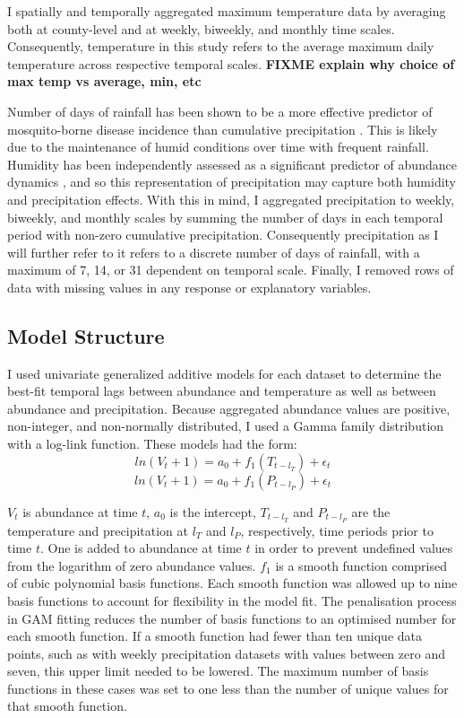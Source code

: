 I spatially and temporally aggregated maximum temperature data by averaging both at county-level and at weekly, biweekly, and monthly time scales. Consequently, temperature in this study refers to the average maximum daily temperature across respective temporal scales.  \textbf{FIXME explain why choice of max temp vs average, min, etc}

Number of days of rainfall has been shown to be a more effective predictor of mosquito-borne disease incidence than cumulative precipitation \citep{Xu2017}. This is likely due to the maintenance of humid conditions over time with frequent rainfall. Humidity has been independently assessed as a significant predictor of abundance dynamics \citep{Trawinski2008}, and so this representation of precipitation may capture both humidity and precipitation effects. With this in mind, I aggregated precipitation to weekly, biweekly, and monthly scales by summing the number of days in each temporal period with non-zero cumulative precipitation. Consequently precipitation as I will further refer to it refers to a discrete number of days of rainfall, with a maximum of 7, 14, or 31 dependent on temporal scale. Finally, I removed rows of data with missing values in any response or explanatory variables. 


\subsection{Model Structure}

I used univariate generalized additive models for each dataset to determine the best-fit temporal lags between abundance and temperature as well as between abundance and precipitation. Because aggregated abundance values are positive, non-integer, and non-normally distributed, I used a Gamma family distribution with a log-link function. These models had the form:
\begin{equation}
	ln(V_t + 1) = a_0 + f_1(T_{t-l_T}) + \epsilon_t
	\label{eq: univariateT}
\end{equation}
\begin{equation}
	ln(V_t + 1) = a_0 + f_1(P_{t-l_P}) + \epsilon_t
	\label{eq: univariateP}
\end{equation}


$V_t$ is abundance at time $t$, $a_0$ is the intercept, $T_{t-l_T}$ and $P_{t-l_P}$ are the temperature and precipitation at $l_T$ and $l_P$, respectively, time periods prior to time $t$. One is added to abundance at time $t$ in order to prevent undefined values from the logarithm of zero abundance values. $f_1$ is a smooth function comprised of cubic polynomial basis functions. Each smooth function was allowed up to nine basis functions to account for flexibility in the model fit. The penalisation process in GAM fitting reduces the number of basis functions to an optimised number for each smooth function. If a smooth function had fewer than ten unique data points, such as with weekly precipitation datasets with values between zero and seven, this upper limit needed to be lowered. The maximum number of basis functions in these cases was set to one less than the number of unique values for that smooth function. 

